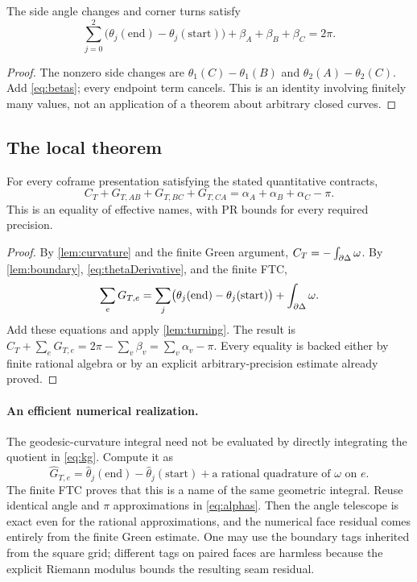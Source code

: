 \begin{lemma}\label{lem:turning}
The side angle changes and corner turns satisfy
\[
\sum_{j=0}^2\bigl(\theta_j(\mathrm{end})-\theta_j(\mathrm{start})\bigr)
+\beta_A+\beta_B+\beta_C=2\pi.
\]
\end{lemma}
\begin{proof}
The nonzero side changes are
$\theta_1(C)-\theta_1(B)$ and $\theta_2(A)-\theta_2(C)$.
Add \eqref{eq:betas}; every endpoint term cancels. This is an identity involving finitely many values, not an application of a theorem about arbitrary closed curves.
\end{proof}

\subsection{The local theorem}

\begin{theorem}\label{thm:triangle}
For every coframe presentation satisfying the stated quantitative contracts,
\begin{equation}\label{eq:triangle}
\boxed{\quad
C_T+G_{T,AB}+G_{T,BC}+G_{T,CA}
=\alpha_A+\alpha_B+\alpha_C-\pi.\quad}
\end{equation}
This is an equality of effective names, with PR bounds for every required precision.
\end{theorem}
\begin{proof}
By \cref{lem:curvature} and the finite Green argument,
$C_T=-\int_{\partial\Delta}\omega$.
By \cref{lem:boundary}, \eqref{eq:thetaDerivative}, and the finite FTC,
\[
\sum_eG_{T,e}
=\sum_j\bigl(\theta_j(\mathrm{end})-\theta_j(\mathrm{start})\bigr)
+\int_{\partial\Delta}\omega.
\]
Add these equations and apply \cref{lem:turning}. The result is
$C_T+\sum_eG_{T,e}=2\pi-\sum_v\beta_v
=\sum_v\alpha_v-\pi$.
Every equality is backed either by finite rational algebra or by an explicit arbitrary-precision estimate already proved.
\end{proof}

\paragraph{An efficient numerical realization.}
The geodesic-curvature integral need not be evaluated by directly integrating the quotient in \eqref{eq:kg}. Compute it as
\[
\widehat G_{T,e}
=\widehat\theta_j(\mathrm{end})-\widehat\theta_j(\mathrm{start})
+\text{a rational quadrature of }\omega\text{ on }e.
\]
The finite FTC proves that this is a name of the same geometric integral. Reuse identical angle and $\pi$ approximations in \eqref{eq:alphas}. Then the angle telescope is exact even for the rational approximations, and the numerical face residual comes entirely from the finite Green estimate. One may use the boundary tags inherited from the square grid; different tags on paired faces are harmless because the explicit Riemann modulus bounds the resulting seam residual.

